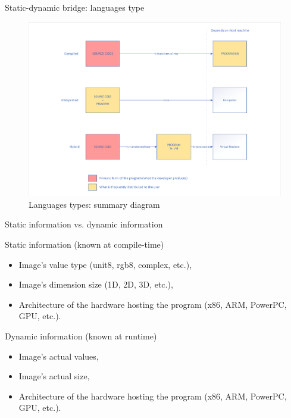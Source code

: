 \documentclass[12pt,aspectratio=169]{beamer}
\begin{document}
\begin{frame}{Static-dynamic bridge: languages type}
  \begin{figure}[htbp]
    \centering
    \includegraphics[width=.75\textwidth]{../figures/comp_inter_hybrid_summary}
    \caption{Languages types: summary diagram}
  \end{figure}
\end{frame}

\begin{frame}{Static information vs. dynamic information}
  \begin{alertblock}{Static information (known at compile-time)}
    \begin{itemize}
      \item Image's value type (unit8, rgb8, complex, etc.),
      \item Image's dimension size (1D, 2D, 3D, etc.),
      \item Architecture of the hardware hosting the program (x86, ARM, PowerPC, GPU, etc.).
    \end{itemize}
  \end{alertblock}
  \begin{alertblock}{Dynamic information (known at runtime)}
    \begin{itemize}
      \item Image's actual values,
      \item Image's actual size,
      \item Architecture of the hardware hosting the program (x86, ARM, PowerPC, GPU, etc.).
    \end{itemize}
  \end{alertblock}
\end{frame}
\end{document}
